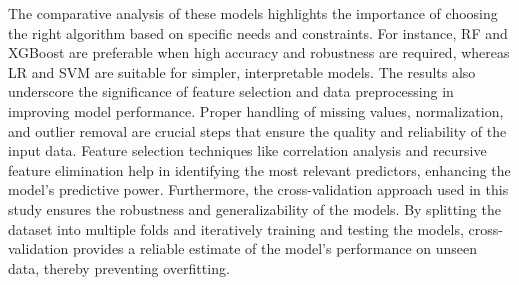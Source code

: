 The comparative analysis of these models highlights the importance of choosing the right algorithm based on specific needs and constraints. For instance, RF and XGBoost are preferable when high accuracy and robustness are required, whereas LR and SVM are suitable for simpler, interpretable models.
The results also underscore the significance of feature selection and data preprocessing in improving model performance. Proper handling of missing values, normalization, and outlier removal are crucial steps that ensure the quality and reliability of the input data. Feature selection techniques like correlation analysis and recursive feature elimination help in identifying the most relevant predictors, enhancing the model’s predictive power.
Furthermore, the cross-validation approach used in this study ensures the robustness and generalizability of the models. By splitting the dataset into multiple folds and iteratively training and testing the models, cross-validation provides a reliable estimate of the model’s performance on unseen data, thereby preventing overfitting.

